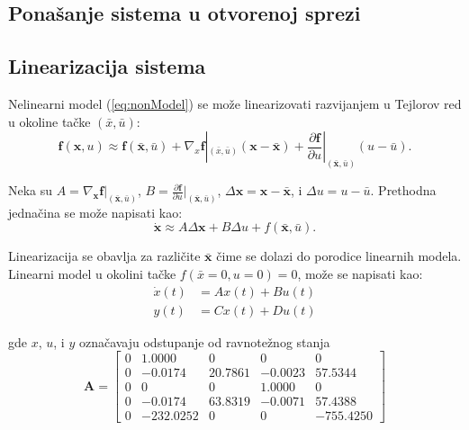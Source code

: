 \documentclass[a4paper,11pt]{article}
\theoremstyle{definition} \newtheorem{deff}{Definicija}[section]
\theoremstyle{definition} \newtheorem{prim}[deff]{Primer}
\theoremstyle{plain} \newtheorem{teor}[deff]{Teorema}
\begin{document}
	
	
	
	
	
	\clearpage
	
	
	\subsection{Ponašanje sistema u otvorenoj sprezi}
	
	
	
	\clearpage 
	\subsection{Linearizacija sistema}
	\label{sec:linearizacija}
	
	Nelinearni model (\ref{eq:nonModel}) se može linearizovati razvijanjem u Tejlorov red u okoline tačke $(\bar{x}, \bar{u})$:
	\begin{equation}
		\mathbf{f}(\mathbf{x}, u) \approx \mathbf{f}(\mathbf{\bar{x}}, \bar{u}) + \nabla_x \mathbf{f}|_{(\bar{x},\bar{u})} (\mathbf{x} - \mathbf{\bar{x}}) + \frac{\partial \mathbf{f}}{\partial u}|_{(\mathbf{\bar{x}},\bar{u})} (u - \bar{u}). \label{eq:linearization}
	\end{equation}
	
	Neka su $A = \nabla_{\mathbf{x}} \mathbf{f}|_{(\bar{\mathbf{x}},\bar{u})}$, $B = \frac{\partial \mathbf{f}}{\partial u}|_{(\bar{\mathbf{x}},\bar{u})}$, $\Delta \mathbf{x} = \mathbf{x} - \bar{\mathbf{x}}$, i $\Delta u = u - \bar{u}$.
	Prethodna jednačina se može napisati kao:
	\begin{equation}
		\dot{\mathbf{x}} \approx A\Delta \mathbf{x} + B\Delta u + f(\bar{\mathbf{x}}, \bar{u}). \label{eq:linearized_system}
	\end{equation}
	
	Linearizacija se obavlja za različite $\bar{\mathbf{x}}$ čime se dolazi do porodice linearnih modela. Linearni model u okolini tačke  $f(\bar{x} = 0, u = 0) = 0$, može se napisati kao:
	\begin{align}
		\dot{x}(t) &= Ax(t) + Bu(t) \\
		y(t) &= Cx(t) + Du(t)
	\end{align}
	
	
	gde  $x$, $u$, i $y$ označavaju odstupanje od ravnotežnog stanja
	\[
	\mathbf{A} =
	\begin{bmatrix}
		0 & 1.0000 & 0 & 0 & 0 \\
		0 & -0.0174 & 20.7861 & -0.0023 & 57.5344 \\
		0 & 0 & 0 & 1.0000 & 0 \\
		0 & -0.0174 & 63.8319 & -0.0071 & 57.4388 \\
		0 & -232.0252 & 0 & 0 & -755.4250
	\end{bmatrix}
	\]
	
\end{document}
